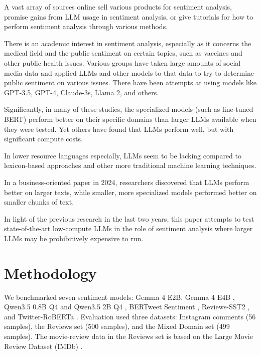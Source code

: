 \documentclass[11pt,table,xcdraw]{article}
\begin{document}
A vast array of sources online sell various products for sentiment analysis, promise gains from LLM usage in sentiment analysis, or give tutorials for how to perform sentiment analysis through various methods. \cite{burchell2024llmssentiment}

There is an academic interest in sentiment analysis, especially as it concerns the medical field and the public sentiment on certain topics, such as vaccines and other public health issues. \cite{gandy2025publichealth}
Various groups have taken large amounts of social media data and applied LLMs and other models to that data to try to determine public sentiment on various issues. There have been attempts at using models like GPT-3.5, GPT-4, Claude-3s, Llama 2, and others.
\cite{annan2025vaccine}

Significantly, in many of these studies, the specialized models (such as fine-tuned BERT) perform better on their specific domains than larger LLMs available when they were tested. \cite{elmitwalli2024cop9} Yet others have found that LLMs perform well, but with significant compute costs. \cite{medrxiv2024preprint}

In lower resource languages especially, LLMs seem to be lacking compared to lexicon-based approaches and other more traditional machine learning techniques. \cite{kandala2025llmsvstraditional}

In a business-oriented paper in 2024, researchers discovered that LLMs perform better on larger texts, while smaller, more specialized models performed better on smaller chunks of text. \cite{mdpi2024article}

In light of the previous research in the last two years, this paper attempts to test state-of-the-art low-compute LLMs in the role of sentiment analysis where larger LLMs may be prohibitively expensive to run.

\section{Methodology}
We benchmarked seven sentiment models: Gemma 4 E2B, Gemma 4 E4B \cite{gemma4}, Qwen3.5 0.8B Q4 and Qwen3.5 2B Q4 \cite{qwen35}, BERTweet Sentiment \cite{bertweet}, Reviews-SST2 \cite{socher2013recursive}, and Twitter-RoBERTa \cite{barbieri2020tweeteval}. Evaluation used three datasets: Instagram comments (56 samples), the Reviews set (500 samples), and the Mixed Domain set (499 samples). The movie-review data in the Reviews set is based on the Large Movie Review Dataset (IMDb) \cite{maas2011learning}.
\end{document}
